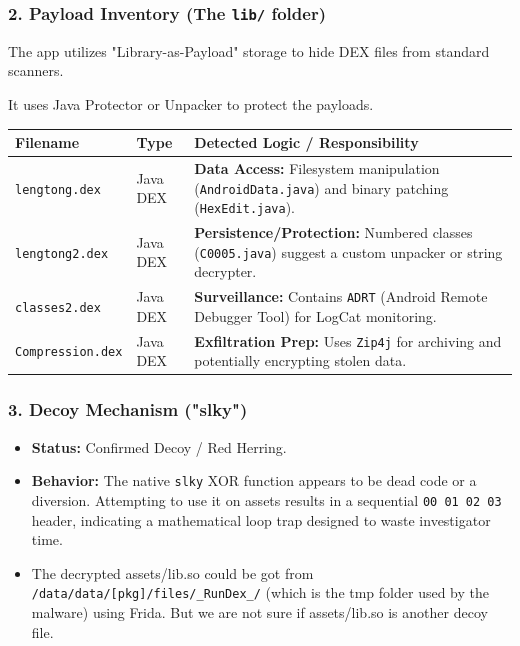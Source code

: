 \documentclass[
]{article}
\begin{document}
\subsubsection{\texorpdfstring{2. Payload Inventory (The \texttt{lib/}
folder)}{2. Payload Inventory (The lib/ folder)}}\label{2-payload-inventory-the-lib-folder}

The app utilizes "Library-as-Payload" storage to hide DEX files from
standard scanners.

It uses Java Protector or Unpacker to protect the payloads.

\begin{longtable}[]{@{}lll@{}}
\toprule\noalign{}
Filename & Type & Detected Logic / Responsibility \\
\midrule\noalign{}
\endhead
\bottomrule\noalign{}
\endlastfoot
\texttt{lengtong.dex} & Java DEX & \textbf{Data Access:} Filesystem
manipulation (\texttt{AndroidData.java}) and binary patching
(\texttt{HexEdit.java}). \\
\texttt{lengtong2.dex} & Java DEX & \textbf{Persistence/Protection:}
Numbered classes (\texttt{C0005.java}) suggest a custom unpacker or
string decrypter. \\
\texttt{classes2.dex} & Java DEX & \textbf{Surveillance:} Contains
\texttt{ADRT} (Android Remote Debugger Tool) for LogCat monitoring. \\
\texttt{Compression.dex} & Java DEX & \textbf{Exfiltration Prep:} Uses
\texttt{Zip4j} for archiving and potentially encrypting stolen data. \\
\end{longtable}

\subsubsection{3. Decoy Mechanism
("slky")}\label{3-decoy-mechanism-slky}

\begin{itemize}
\item
  \textbf{Status:} Confirmed Decoy / Red Herring.
\item
  \textbf{Behavior:} The native \texttt{slky} XOR function appears to be
  dead code or a diversion. Attempting to use it on assets results in a
  sequential \texttt{00\ 01\ 02\ 03} header, indicating a mathematical
  loop trap designed to waste investigator time.
\item
  The decrypted assets/lib.so could be got from
  \texttt{/data/data/{[}pkg{]}/files/\_RunDex\_/} (which is the tmp
  folder used by the malware) using Frida. But we are not sure if
  assets/lib.so is another decoy file.
\end{itemize}
\end{document}
